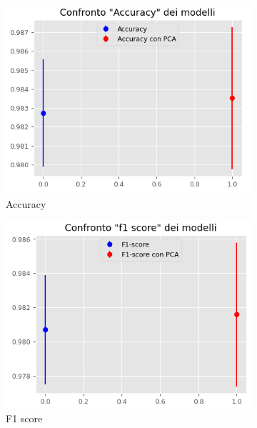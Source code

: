 \begin{figure}[!ht]
    \centering
    \begin{subfigure}[b]{0.4\textwidth}
        \centering
        \includegraphics[width=\textwidth]{img/rete/intervalliAcc.png}
        \caption{Accuracy}
        \label{fig:acc_pca}
    \end{subfigure}
    \hfill
    \begin{subfigure}[b]{0.4\textwidth}
        \centering
        \includegraphics[width=\textwidth]{img/rete/intervalliF1.png}
        \caption{F1 score}
        \label{fig:f1_pca}
    \end{subfigure}
    \hfill
    \begin{subfigure}[b]{0.4\textwidth}

\end{subfigure}
\end{figure}
